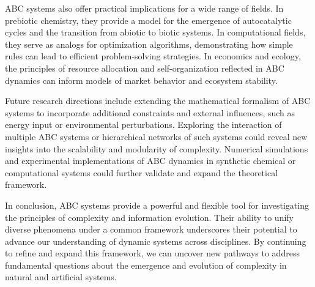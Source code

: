 \documentclass[%
 preprint, linenumbers,
 amsmath,amssymb,
 aps, physrev,
]{revtex4-2}
\begin{document}
ABC systems also offer practical implications for a wide range of fields. In prebiotic chemistry, they provide a model for the emergence of autocatalytic cycles and the transition from abiotic to biotic systems. In computational fields, they serve as analogs for optimization algorithms, demonstrating how simple rules can lead to efficient problem-solving strategies. In economics and ecology, the principles of resource allocation and self-organization reflected in ABC dynamics can inform models of market behavior and ecosystem stability.

Future research directions include extending the mathematical formalism of ABC systems to incorporate additional constraints and external influences, such as energy input or environmental perturbations. Exploring the interaction of multiple ABC systems or hierarchical networks of such systems could reveal new insights into the scalability and modularity of complexity. Numerical simulations and experimental implementations of ABC dynamics in synthetic chemical or computational systems could further validate and expand the theoretical framework.

In conclusion, ABC systems provide a powerful and flexible tool for investigating the principles of complexity and information evolution. Their ability to unify diverse phenomena under a common framework underscores their potential to advance our understanding of dynamic systems across disciplines. By continuing to refine and expand this framework, we can uncover new pathways to address fundamental questions about the emergence and evolution of complexity in natural and artificial systems.
\end{document}
